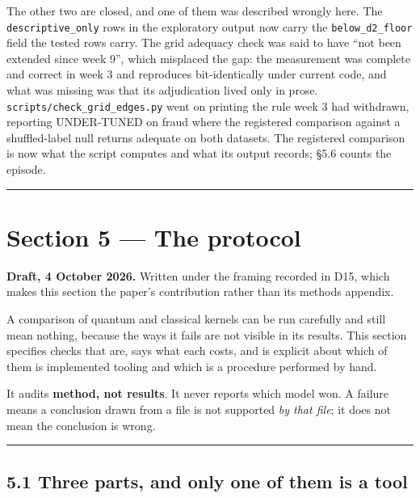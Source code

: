 \documentclass[
  10pt,
]{article}
\begin{document}
The other two are closed, and one of them was described wrongly here.
The \texttt{descriptive\_\allowbreak{}only} rows in the exploratory output now carry
the \texttt{below\_\allowbreak{}d2\_\allowbreak{}floor} field the tested rows carry. The grid
adequacy check was said to have ``not been extended since week 9'',
which misplaced the gap: the measurement was complete and correct in
week 3 and reproduces bit-identically under current code, and what was
missing was that its adjudication lived only in prose.
\texttt{scripts/\allowbreak{}check\_\allowbreak{}grid\_\allowbreak{}edges.py} went on printing the rule week 3
had withdrawn, reporting UNDER-TUNED on fraud where the registered
comparison against a shuffled-label null returns adequate on both
datasets. The registered comparison is now what the script computes and
what its output records; \S{}5.6 counts the episode.

\begin{center}\rule{0.5\linewidth}{0.5pt}\end{center}

\section{Section 5 --- The protocol}\label{section-5-the-protocol}

\textbf{Draft, 4 October 2026.} Written under the framing recorded in
D15, which makes this section the paper's contribution rather than its
methods appendix.

A comparison of quantum and classical kernels can be run carefully and
still mean nothing, because the ways it fails are not visible in its
results. This section specifies checks that are, says what each costs,
and is explicit about which of them is implemented tooling and which is
a procedure performed by hand.

It audits \textbf{method, not results}. It never reports which model
won. A failure means a conclusion drawn from a file is not supported
\emph{by that file}; it does not mean the conclusion is wrong.

\begin{center}\rule{0.5\linewidth}{0.5pt}\end{center}

\subsection{5.1 Three parts, and only one of them is a
tool}\label{three-parts-and-only-one-of-them-is-a-tool}
\end{document}

